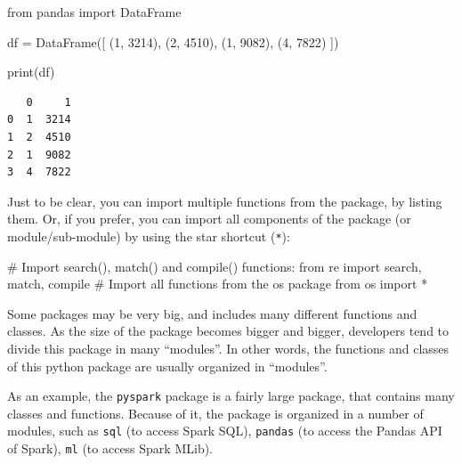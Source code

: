 \documentclass[
  11pt,
  letterpaper,
  DIV=11,
  numbers=noendperiod]{scrreprt}
\newenvironment{Shaded}{\begin{snugshade}}{\end{snugshade}}
\newcommand{\BuiltInTok}[1]{\textcolor[rgb]{0.00,0.23,0.31}{#1}}
\newcommand{\CommentTok}[1]{\textcolor[rgb]{0.37,0.37,0.37}{#1}}
\newcommand{\DecValTok}[1]{\textcolor[rgb]{0.68,0.00,0.00}{#1}}
\newcommand{\ImportTok}[1]{\textcolor[rgb]{0.00,0.46,0.62}{#1}}
\newcommand{\NormalTok}[1]{\textcolor[rgb]{0.00,0.23,0.31}{#1}}
\newcommand{\OperatorTok}[1]{\textcolor[rgb]{0.37,0.37,0.37}{#1}}
\begin{document}
\begin{Shaded}
\begin{Highlighting}[]
\ImportTok{from}\NormalTok{ pandas }\ImportTok{import}\NormalTok{ DataFrame}

\NormalTok{df }\OperatorTok{=}\NormalTok{ DataFrame([}
\NormalTok{  (}\DecValTok{1}\NormalTok{, }\DecValTok{3214}\NormalTok{), (}\DecValTok{2}\NormalTok{, }\DecValTok{4510}\NormalTok{), }
\NormalTok{  (}\DecValTok{1}\NormalTok{, }\DecValTok{9082}\NormalTok{), (}\DecValTok{4}\NormalTok{, }\DecValTok{7822}\NormalTok{)}
\NormalTok{])}

\BuiltInTok{print}\NormalTok{(df)}
\end{Highlighting}
\end{Shaded}

\begin{verbatim}
   0     1
0  1  3214
1  2  4510
2  1  9082
3  4  7822
\end{verbatim}

Just to be clear, you can import multiple functions from the package, by
listing them. Or, if you prefer, you can import all components of the
package (or module/sub-module) by using the star shortcut (\texttt{*}):

\begin{Shaded}
\begin{Highlighting}[]
\CommentTok{\# Import \textasciigrave{}search()\textasciigrave{}, \textasciigrave{}match()\textasciigrave{} and \textasciigrave{}compile()\textasciigrave{} functions:}
\ImportTok{from}\NormalTok{ re }\ImportTok{import}\NormalTok{ search, match, }\BuiltInTok{compile}
\CommentTok{\# Import all functions from the \textasciigrave{}os\textasciigrave{} package}
\ImportTok{from}\NormalTok{ os }\ImportTok{import} \OperatorTok{*}
\end{Highlighting}
\end{Shaded}

Some packages may be very big, and includes many different functions and
classes. As the size of the package becomes bigger and bigger,
developers tend to divide this package in many ``modules''. In other
words, the functions and classes of this python package are usually
organized in ``modules''.

As an example, the \texttt{pyspark} package is a fairly large package,
that contains many classes and functions. Because of it, the package is
organized in a number of modules, such as \texttt{sql} (to access Spark
SQL), \texttt{pandas} (to access the Pandas API of Spark), \texttt{ml}
(to access Spark MLib).
\end{document}
